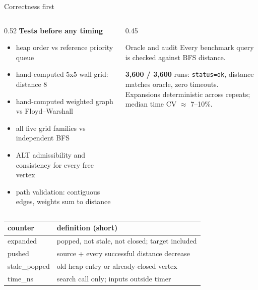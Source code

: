 \documentclass[aspectratio=169,10pt]{beamer}
\begin{document}
\begin{frame}{Correctness first}
  \begin{columns}[T,onlytextwidth]
    \begin{column}{0.52\textwidth}
      \textbf{Tests before any timing}
      \begin{itemize}
        \item heap order vs reference priority queue
        \item hand-computed 5x5 wall grid: distance 8
        \item hand-computed weighted graph vs Floyd--Warshall
        \item all five grid families vs independent BFS
        \item ALT admissibility and consistency for every free vertex
        \item path validation: contiguous edges, weights sum to distance
      \end{itemize}
    \end{column}
    \begin{column}{0.45\textwidth}
      \begin{block}{Oracle and audit}
        Every benchmark query is checked against BFS distance.
        \vspace{0.3em}

        \textbf{3,600 / 3,600} runs: \texttt{status=ok}, distance matches
        oracle, zero timeouts.\\
        \vspace{0.3em}
        Expansions deterministic across repeats; median time CV $\approx$ 7--10\%.
      \end{block}
    \end{column}
  \end{columns}
  \vspace{0.6em}
  \centering
  \small
  \begin{tabular}{ll}
    \toprule
    counter & definition (short)\\
    \midrule
    expanded & popped, not stale, not closed; target included\\
    pushed & source + every successful distance decrease\\
    stale\_popped & old heap entry or already-closed vertex\\
    time\_ns & search call only; inputs outside timer\\
    \bottomrule
  \end{tabular}
\end{frame}
\end{document}
